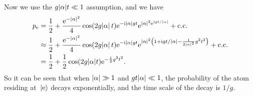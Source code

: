 \documentclass[hyperref, a4paper]{article}
\newcommand*{\ii}{\mathrm{i}}
\newcommand*{\ee}{\mathrm{e}}
\newcommand*{\kete}{\ket*{\text{e}}}
\newcommand*{\pope}{p_{\text{e}}}
\begin{document}
Now we use the $g \abs{\alpha} t \ll 1$ assumption, and we have 
\begin{equation}
    \begin{aligned}
        \pope &= \frac{1}{2} + \frac{\ee^{- \abs*{\alpha}^2}}{4} 
        \cos( 2 g \abs*{\alpha} t) \ee^{- \ii \abs{\alpha} g t} \ee^{\abs{\alpha}^2 \ee^{\ii g t / \abs{\alpha}}} + \text{c.c.} \\
        &\approx  \frac{1}{2} + \frac{\ee^{- \abs*{\alpha}^2}}{4} 
        \cos( 2 g \abs*{\alpha} t) \ee^{- \ii \abs{\alpha} g t} \ee^{\abs{\alpha}^2 \left(1 + \ii g t / \abs{\alpha} - \frac{1}{2 \abs{\alpha}^2} g^2 t^2  \right) } + \text{c.c.} \\
        &= \frac{1}{2} + \frac{1}{2} \cos (2 g \abs{\alpha} t) \ee^{- \frac{1}{2} g^2 t^2}.
    \end{aligned}
\end{equation}
So it can be seen that when $\abs{\alpha} \gg 1$ and $g t \abs{\alpha} \ll 1$,
the probability of the atom residing at $\kete$ decays exponentially,
and the time scale of the decay is $1/g$.

\textit{}
\end{document}
